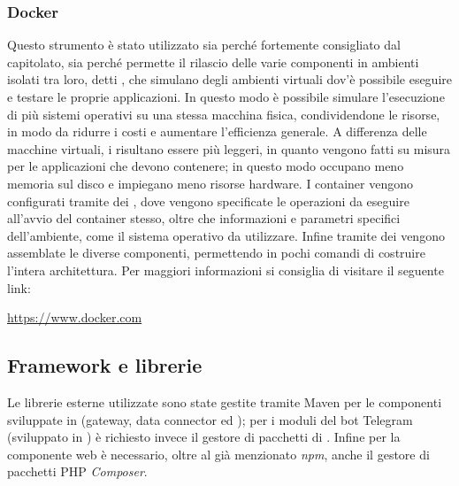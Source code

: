 		\subsubsection{Docker}
			Questo strumento è stato utilizzato sia perché fortemente consigliato dal capitolato, sia perché permette il rilascio delle varie componenti in ambienti isolati tra loro, detti , che simulano degli ambienti virtuali dov'è possibile eseguire e testare le proprie applicazioni.
			\newline
			In questo modo è possibile simulare l'esecuzione di più sistemi operativi su una stessa macchina fisica, condividendone le risorse, in modo da ridurre i costi e aumentare l'efficienza generale.
			\newline
			A differenza delle macchine virtuali, i  risultano essere più leggeri, in quanto vengono fatti su misura per le applicazioni che devono contenere; in questo modo occupano meno memoria sul disco e impiegano meno risorse hardware.
			\newline
			I container vengono configurati tramite dei , dove vengono specificate le operazioni da eseguire all'avvio del container stesso, oltre che informazioni e parametri specifici dell'ambiente, come il sistema operativo  da utilizzare. Infine tramite dei  vengono assemblate le diverse componenti, permettendo in pochi comandi di costruire l'intera architettura.
			\newline
			Per maggiori informazioni si consiglia di visitare il seguente link:
			\newline
			\begin{center}
				\url{https://www.docker.com}
			\end{center}
	\subsection{Framework e librerie}
		Le librerie esterne utilizzate sono state gestite tramite Maven per le componenti sviluppate in  (gateway, data connector ed ); per i moduli del bot Telegram (sviluppato in ) è richiesto invece il gestore di pacchetti di  . Infine per la componente web è necessario, oltre al già menzionato \textit{npm}, anche il gestore di pacchetti PHP \textit{Composer}.
